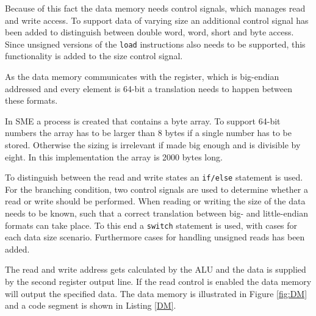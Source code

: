         Because of this fact the data memory needs control signals, which manages read and write access. To support data of varying size an additional control signal has been added to distinguish between double word, word, short and byte access. Since unsigned versions of the \texttt{load} instructions also needs to be supported, this functionality is added to the size control signal.
        
        As the data memory communicates with the register, which is big-endian addressed and every element is 64-bit a translation needs to happen between these formats.
        
        In SME a process is created that contains a byte array. To support 64-bit numbers the array has to be larger than 8 bytes if a single number has to be stored. Otherwise the sizing is irrelevant if made big enough and is divisible by eight. In this implementation the array is 2000 bytes long.
        
        To distinguish between the read and write states an \texttt{if/else} statement is used. For the branching condition, two control signals are used to determine whether a read or write should be performed. When reading or writing the size of the data needs to be known, such that a correct translation between big- and little-endian formats can take place. To this end a \texttt{switch} statement is used, with cases for each data size scenario. Furthermore cases for handling unsigned reads has been added.
        
        The read and write address gets calculated by the ALU and the data is supplied by the second register output line. If the read control is enabled the data memory will output the specified data. The data memory is illustrated in Figure \ref{fig:DM} and a code segment is shown in Listing \ref{DM}.
        
